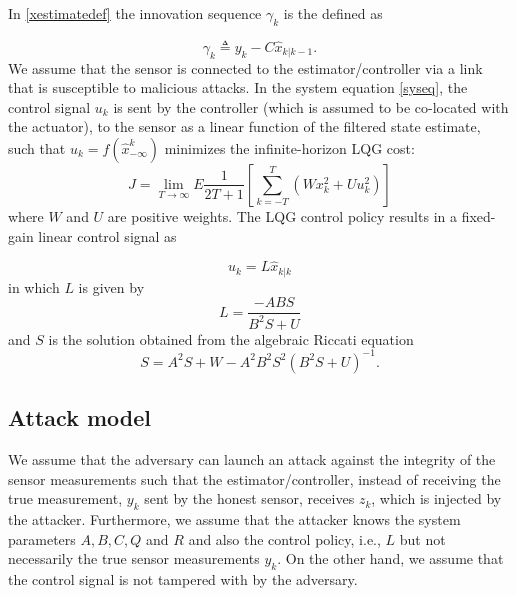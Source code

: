 \documentclass[journal,10pt]{IEEEtran}
\begin{document}
In \eqref{xestimatedef} the innovation sequence $\gamma_{k}$ is the  defined as

\begin{equation}
\gamma_{k}\triangleq y_{k}-C\hat{x}_{k|k-1}.\label{gammadef}
\end{equation}
We assume that the sensor is connected to the estimator/controller via a link that is susceptible to malicious attacks.
In the system equation \eqref{syseq}, the control signal $u_{k}$ is sent
by the controller (which  is assumed to be co-located with the actuator), to the sensor as a
linear function of the filtered state estimate, such that
$u_{k}=f(\hat{x}_{-\infty}^{k})$ minimizes the infinite-horizon
LQG cost:
\begin{equation}
J=\lim_{T\rightarrow\infty}E\frac{1}{2T+1}[\sum\limits_{k=-T}^{T}(Wx_{k}^{2}+Uu_{k}^{2})]\label{LQG}
\end{equation}
where $W$ and $U$ are positive weights. The LQG control policy
results in a fixed-gain linear control signal as

\begin{equation}
u_{k}=L\hat{x}_{k|k}\label{contsig}
\end{equation}
in which $L$ is given by
\begin{equation}
L=\frac{-ABS}{B^{2}S+U}
\end{equation}
and $S$ is the solution obtained from the algebraic Riccati equation
\begin{equation}
S=A^{2}S+W-A^{2}B^{2}S^{2}(B^{2}S+U)^{-1}.
\end{equation}
\subsection{Attack model}
We assume that the adversary can launch an attack against the integrity
of the sensor measurements such that the estimator/controller, instead
of receiving the true measurement, $y_{k}$ sent by the honest sensor,
receives $z_{k}$, which is injected by the attacker. 
Furthermore, we assume that
the attacker knows the system parameters $A, B,
C, Q$ and $R$ and also the control policy, i.e., $L$ but not
necessarily the true sensor measurements $y_{k}$.
On the other hand, we assume that the control
signal is not tampered with by the adversary.
\end{document}
